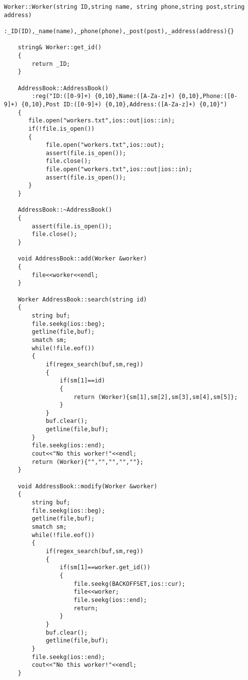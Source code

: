\documentclass[UTF8]{ctexart}
\begin{document}
\begin{lstlisting}[language={[ANSI]C++}]
    Worker::Worker(string ID,string name, string phone,string post,string address)
        :_ID(ID),_name(name),_phone(phone),_post(post),_address(address){}
    
    string& Worker::get_id()
    {
        return _ID;
    }
    
    AddressBook::AddressBook()
        :reg("ID:([0-9]+) {0,10},Name:([A-Za-z]+) {0,10},Phone:([0-9]+) {0,10},Post ID:([0-9]+) {0,10},Address:([A-Za-z]+) {0,10}")
    { 
       file.open("workers.txt",ios::out|ios::in);
       if(!file.is_open())
       {
            file.open("workers.txt",ios::out);
            assert(file.is_open());
            file.close();
            file.open("workers.txt",ios::out|ios::in);
            assert(file.is_open());
       }
    }
    
    AddressBook::~AddressBook()
    {
        assert(file.is_open());
        file.close();
    }
    
    void AddressBook::add(Worker &worker)
    {
        file<<worker<<endl;
    }
    
    Worker AddressBook::search(string id)
    {
        string buf;
        file.seekg(ios::beg);
        getline(file,buf);
        smatch sm;
        while(!file.eof())
        {
            if(regex_search(buf,sm,reg))
            {
                if(sm[1]==id)
                {
                    return (Worker){sm[1],sm[2],sm[3],sm[4],sm[5]};
                }
            }
            buf.clear();
            getline(file,buf);
        }
        file.seekg(ios::end);
        cout<<"No this worker!"<<endl;
        return (Worker){"","","","",""};
    }
    
    void AddressBook::modify(Worker &worker)
    {
        string buf;
        file.seekg(ios::beg);
        getline(file,buf);
        smatch sm;
        while(!file.eof())
        {
            if(regex_search(buf,sm,reg))
            {
                if(sm[1]==worker.get_id())
                {
                    file.seekg(BACKOFFSET,ios::cur);
                    file<<worker;
                    file.seekg(ios::end);
                    return;
                }
            }
            buf.clear();
            getline(file,buf);
        }
        file.seekg(ios::end);
        cout<<"No this worker!"<<endl;    
    }
\end{lstlisting}
\end{document}
